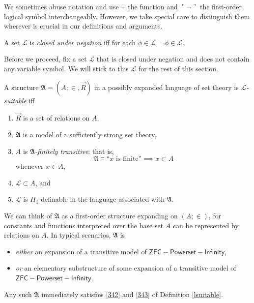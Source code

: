 \documentclass[12pt]{article}
\numberwithin{equation}{section}
\begin{document}
We sometimes abuse notation and use $\neg$ the function and $\ulcorner \neg \urcorner$ the first-order logical symbol interchangeably. However, we take special care to distinguish them wherever is crucial in our definitions and arguments.

\begin{defi}
A set $\mathcal{L}$ is \emph{closed under negation} iff for each $\phi \in \mathcal{L}$, $\neg \phi \in \mathcal{L}$.
\end{defi}

Before we proceed, fix a set $\mathcal{L}$ that is closed under negation and does not contain any variable symbol. We will stick to this $\mathcal{L}$ for the rest of this section.

\begin{defi}\label{lsuitable}
A structure $\mathfrak{A} = (A; \in, \Vec{R})$ in a possibly expanded language of set theory is $\mathcal{L}$\emph{-suitable} iff
\begin{enumerate}[label=(\alph*)]
    \item $\Vec{R}$ is a set of relations on $A$,
    \item\label{342} $\mathfrak{A}$ is a model of a sufficiently strong set theory,
    \item\label{343} $A$ is $\mathfrak{A}$\emph{-finitely transitive}: that is, 
    \begin{equation*}
        \mathfrak{A} \models \text{``} x \text{ is finite''} \implies x \subset A 
    \end{equation*}
    whenever $x \in A$, 
    \item $\mathcal{L} \subset A$, and
    \item $\mathcal{L}$ is $\Pi_1$-definable in the language associated with $\mathfrak{A}$.
\end{enumerate}
\end{defi}

We can think of $\mathfrak{A}$ as a first-order structure expanding on $(A; \in)$, for constants and functions interpreted over the base set $A$ can be represented by relations on $A$. In typical scenarios, $\mathfrak{A}$ is
\begin{itemize}
    \item \emph{either} an expansion of a transitive model of $\mathsf{ZFC - Powerset - Infinity}$,
    \item \emph{or} an elementary substructure of some expansion of a transitive model of \\ $\mathsf{ZFC - Powerset - Infinity}$.
\end{itemize} 
Any such $\mathfrak{A}$ immediately satisfies \ref{342} and \ref{343} of Definition \ref{lsuitable}. 
\end{document}
